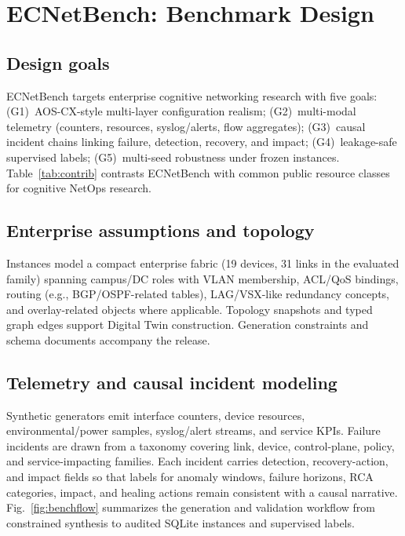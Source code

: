\section{ECNetBench: Benchmark Design}
\label{sec:bench}

\subsection{Design goals}
ECNetBench targets enterprise cognitive networking research with five goals: (G1)~AOS-CX-style multi-layer configuration realism; (G2)~multi-modal telemetry (counters, resources, syslog/alerts, flow aggregates); (G3)~causal incident chains linking failure, detection, recovery, and impact; (G4)~leakage-safe supervised labels; (G5)~multi-seed robustness under frozen instances. Table~\ref{tab:contrib} contrasts ECNetBench with common public resource classes for cognitive NetOps research.


\subsection{Enterprise assumptions and topology}
Instances model a compact enterprise fabric (19 devices, 31 links in the evaluated family) spanning campus/DC roles with VLAN membership, ACL/QoS bindings, routing (e.g., BGP/OSPF-related tables), LAG/VSX-like redundancy concepts, and overlay-related objects where applicable. Topology snapshots and typed graph edges support Digital Twin construction. Generation constraints and schema documents accompany the release.

\subsection{Telemetry and causal incident modeling}
Synthetic generators emit interface counters, device resources, environmental/power samples, syslog/alert streams, and service KPIs. Failure incidents are drawn from a taxonomy covering link, device, control-plane, policy, and service-impacting families. Each incident carries detection, recovery-action, and impact fields so that labels for anomaly windows, failure horizons, RCA categories, impact, and healing actions remain consistent with a causal narrative. Fig.~\ref{fig:benchflow} summarizes the generation and validation workflow from constrained synthesis to audited SQLite instances and supervised labels.

